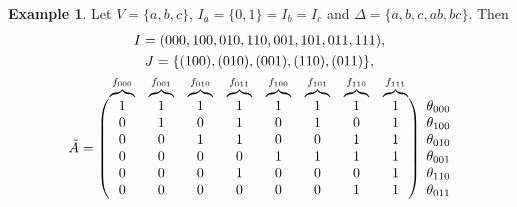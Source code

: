 \documentclass[aos,noinfoline]{imsart}
\theoremstyle{remark}
\theoremstyle{definition}
\newtheorem{example}[theorem]{Example} %
\newcommand\overmat[2]{\smash{%
  \overbrace{#2\strut}^{\text{\color{black}#1}}}}
\begin{document}
\begin{example}
  \label{S-ex22} 
  Let $V=\{a,b,c\}$, $I_a=\{0,1\}=I_b=I_c$ and $\Delta=\{a,b,c,ab,bc\}$.
  Then
  \begin{gather*}
    I =(000,100,010,110,001,101,011,111), \\
    J=\{(100),(010),(001),(110),(011)\}, \\[16pt]
\tilde{A} = \begin{pmatrix}
\overmat{$f_{000}$}{1} & \overmat{$f_{001}$}{1} & \overmat{$f_{010}$}{1} & \overmat{$f_{011}$}{1} & \overmat{$f_{100}$}{1} & \overmat{$f_{101}$}{1} & \overmat{$f_{110}$}{\enskip1\enskip} & \overmat{$f_{111}$}{1} \\
0 & 1 & 0 & 1 & 0 & 1 & 0 & 1 \\
0 & 0 & 1 & 1 & 0 & 0 & 1 & 1 \\
0 & 0 & 0 & 0 & 1 & 1 & 1 & 1 \\
0 & 0 & 0 & 1 & 0 & 0 & 0 & 1 \\
0 & 0 & 0 & 0 & 0 & 0 & 1 & 1
\end{pmatrix}
\;
\begin{matrix}
\theta_{000} \\
\theta_{100} \\
\theta_{010} \\
\theta_{001} \\
\theta_{110} \\
\theta_{011}
\end{matrix}
\end{gather*}
\end{example}
\end{document}
